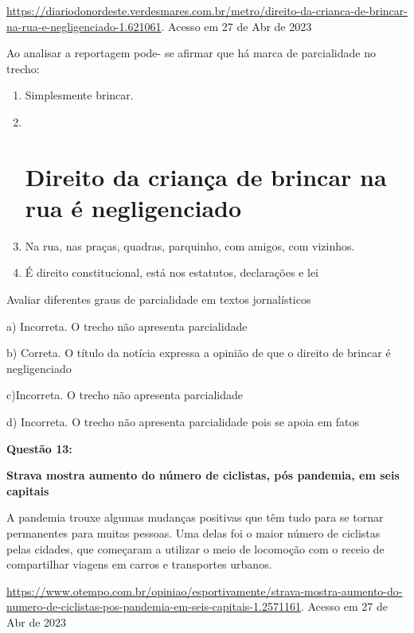 \href{https://diariodonordeste.verdesmares.com.br/metro/direito-da-crianca-de-brincar-na-rua-e-negligenciado-1.621061}{{https://diariodonordeste.verdesmares.com.br/metro/direito-da-crianca-de-brincar-na-rua-e-negligenciado-1.621061}}.
Acesso em 27 de Abr de 2023

Ao analisar a reportagem pode- se afirmar que há marca de parcialidade
no trecho:

\begin{enumerate}
\def\labelenumi{\alph{enumi})}
\item
  Simplesmente brincar.
\item ~
  \hypertarget{direito-da-crianuxe7a-de-brincar-na-rua-uxe9-negligenciado}{%
  \section{Direito da criança de brincar na rua é
  negligenciado}\label{direito-da-crianuxe7a-de-brincar-na-rua-uxe9-negligenciado}}
\item
  Na rua, nas praças, quadras, parquinho, com amigos, com vizinhos.
\item
  É direito constitucional, está nos estatutos, declarações e lei
\end{enumerate}

Avaliar diferentes graus de parcialidade em textos jornalísticos

a) Incorreta. O trecho não apresenta parcialidade

b) Correta. O título da notícia expressa a opinião de que o direito de
brincar é negligenciado

c)Incorreta. O trecho não apresenta parcialidade

d) Incorreta. O trecho não apresenta parcialidade pois se apoia em fatos

\textbf{Questão 13:}

\textbf{Strava mostra aumento do número de ciclistas, pós pandemia, em
seis capitais}

A pandemia trouxe algumas mudanças positivas que têm tudo para se tornar
permanentes para muitas pessoas. Uma delas foi o maior número de
ciclistas pelas cidades, que começaram a utilizar o meio de locomoção
com o receio de compartilhar viagens em carros e transportes urbanos.

\href{https://www.otempo.com.br/opiniao/esportivamente/strava-mostra-aumento-do-numero-de-ciclistas-pos-pandemia-em-seis-capitais-1.2571161.Acesso}{{https://www.otempo.com.br/opiniao/esportivamente/strava-mostra-aumento-do-numero-de-ciclistas-pos-pandemia-em-seis-capitais-1.2571161}}.
Acesso em 27 de Abr de 2023

